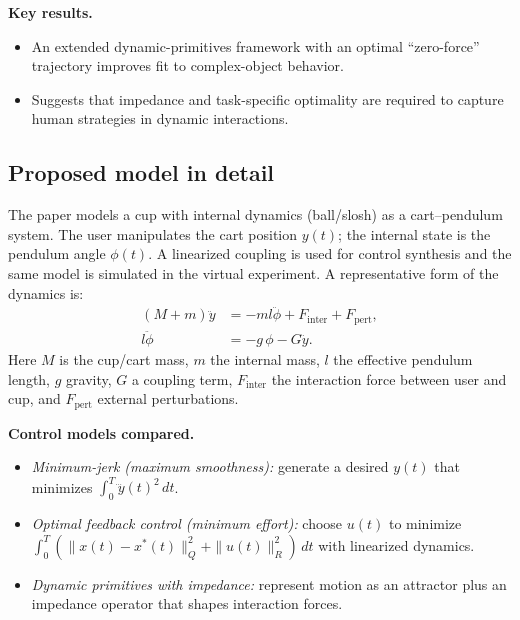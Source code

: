 \documentclass[11pt]{article}
\begin{document}
\textbf{Key results.}
\begin{itemize}[leftmargin=1.2em]
  \item An extended dynamic-primitives framework with an optimal ``zero-force'' trajectory improves fit to complex-object behavior.
  \item Suggests that impedance and task-specific optimality are required to capture human strategies in dynamic interactions.
\end{itemize}

\subsection*{Proposed model in detail}
The paper models a cup with internal dynamics (ball/slosh) as a cart--pendulum system. The user manipulates the cart position $y(t)$; the internal state is the pendulum angle $\phi(t)$. A linearized coupling is used for control synthesis and the same model is simulated in the virtual experiment. A representative form of the dynamics is:
\begin{align}
 (M+m)\ddot{y} &= -m l\ddot{\phi} + F_{\text{inter}} + F_{\text{pert}}, \\
 l\ddot{\phi} &= -g\,\phi - G\ddot{y}.
\end{align}
Here $M$ is the cup/cart mass, $m$ the internal mass, $l$ the effective pendulum length, $g$ gravity, $G$ a coupling term, $F_{\text{inter}}$ the interaction force between user and cup, and $F_{\text{pert}}$ external perturbations.

\textbf{Control models compared.}
\begin{itemize}[leftmargin=1.2em]
  \item \emph{Minimum-jerk (maximum smoothness):} generate a desired $y(t)$ that minimizes $\int_0^T \dddot{y}(t)^2\,dt$.
  \item \emph{Optimal feedback control (minimum effort):} choose $u(t)$ to minimize $\int_0^T (\|x(t)-x^*(t)\|_Q^2 + \|u(t)\|_R^2)\,dt$ with linearized dynamics.
  \item \emph{Dynamic primitives with impedance:} represent motion as an attractor plus an impedance operator that shapes interaction forces.
\end{itemize}
\end{document}
